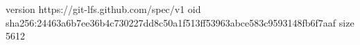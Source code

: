 version https://git-lfs.github.com/spec/v1
oid sha256:24463a6b7ee36b4c730227dd8c50a1f513ff53963abce583c9593148fb6f7aaf
size 5612
